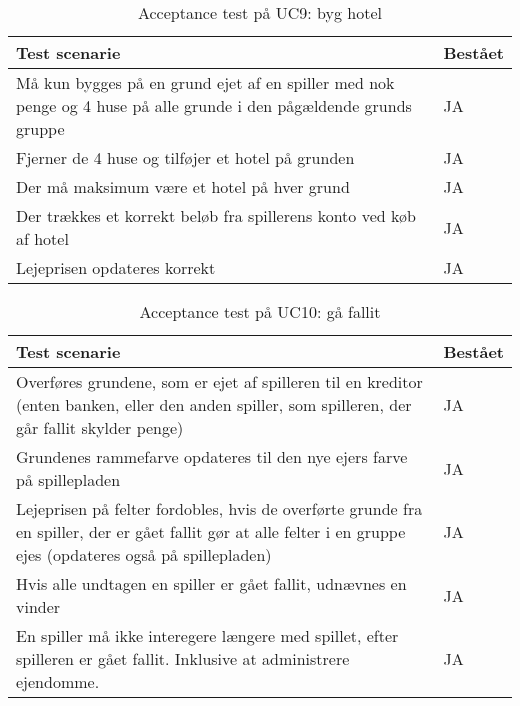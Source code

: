 \documentclass[class=article, crop=false]{standalone}
\begin{document}
    \begin{table}[H]
        \caption{Acceptance test på UC9: byg hotel}
        \begin{tabularx}{\textwidth}{|X|l|}
            \hline
            \textbf{Test scenarie}       & \textbf{Bestået}   \\ \hline
            Må kun bygges på en grund ejet af en spiller med nok penge og 4 huse på alle grunde i den pågældende grunds gruppe     & JA \\ \hline
            Fjerner de 4 huse og tilføjer et hotel på grunden     & JA\\ \hline
            Der må maksimum være et hotel på hver grund     & JA\\ \hline
            Der trækkes et korrekt beløb fra spillerens konto ved køb af hotel     & JA\\ \hline
            Lejeprisen opdateres korrekt    & JA \\ \hline
        \end{tabularx}
    \end{table}

    \begin{table}[H]
        \caption{Acceptance test på UC10: gå fallit}
        \begin{tabularx}{\textwidth}{|X|l|}
            \hline
            \textbf{Test scenarie}       & \textbf{Bestået}   \\ \hline
            Overføres grundene, som er ejet af spilleren til en kreditor (enten banken, eller den anden spiller, som spilleren, der går fallit skylder penge) & JA\\ \hline
            Grundenes rammefarve opdateres til den nye ejers farve på spillepladen & JA\\ \hline
            Lejeprisen på felter fordobles, hvis de overførte grunde fra en spiller, der er gået fallit gør at alle felter i en gruppe ejes (opdateres også på spillepladen) & JA\\ \hline
            Hvis alle undtagen en spiller er gået fallit, udnævnes en vinder& JA\\ \hline
            En spiller må ikke interegere længere med spillet, efter spilleren er gået fallit. Inklusive at administrere ejendomme.& JA \\ \hline
        \end{tabularx}
    \end{table}
\end{document}
